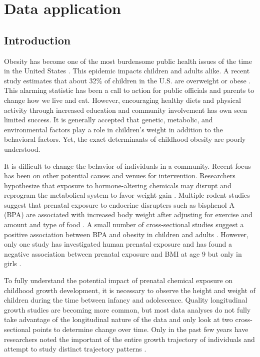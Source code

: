 \chapter{Data application}
\label{chap:data}
\section{Introduction}
Obesity has become one of the most burdensome public health issues of the time in the United States \cite{surgeon2001}.  This epidemic impacts children and adults alike.  A recent study estimates that about 32\% of children in the U.S. are overweight or obese \cite{ogden2008}. This alarming statistic has been a call to action for public officials and parents to change how we live and eat. However, encouraging healthy diets and physical activity through increased education and community involvement has own seen limited success.  It is generally accepted that genetic, metabolic, and environmental factors play a role in children's weight in addition to the behavioral factors. Yet, the exact determinants of childhood obesity are poorly understood.

It is difficult to change the behavior of individuals in a community. Recent focus has been on other potential causes and venues for intervention. Researchers hypothesize that exposure to hormone-altering chemicals may disrupt and reprogram the metabolical system to favor weight gain \cite{tuma2007}. Multiple rodent studies suggest that prenatal exposure to endocrine disrupters such as bisphenol A (BPA) are associated with increased body weight after adjusting for exercise and amount and type of food \cite{rubin2001,akingbemi2004,hiyama2011, howdeshell1999,miyawaki2007,somm2009,wei2011,xu2011}. A small number of cross-sectional studies suggest a positive association between BPA and obesity in children and adults \cite{carwile2011,shankar2012,trasande2012}. However, only one study has investigated human prenatal exposure and has found a negative association between prenatal exposure and BMI at age 9 but only in girls \cite{harley2013}.
 
 To fully understand the potential impact of prenatal chemical exposure on childhood growth development, it is necessary to observe the height and weight of children during the time between infancy and adolescence. Quality longitudinal growth studies are becoming more common, but most data analyses do not fully take advantage of the longitudinal nature of the data and only look at two cross-sectional points to determine change over time. Only in the past few years have researchers noted the important of the entire growth trajectory of individuals and attempt to study distinct trajectory patterns \cite{pryor2011,carter2012,li2007,garden2012}. 

